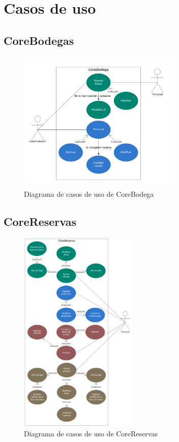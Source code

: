 \chapter{Casos de uso}

\section{CoreBodegas}

\begin{figure}[h]
    \centering
    \includegraphics[width=0.7\textwidth]{figures/casos-de-uso-core-bodega.png}
    \caption{Diagrama de casos de uso de CoreBodega}
    \label{fig:corebodega}
\end{figure}

\section{CoreReservas}

\begin{figure}[h]
    \centering
    \includegraphics[width=0.5\textwidth]{figures/casos-de-uso-core-reservas.png}
    \caption{Diagrama de casos de uso de CoreReservas}
    \label{fig:corereservas}
\end{figure}
